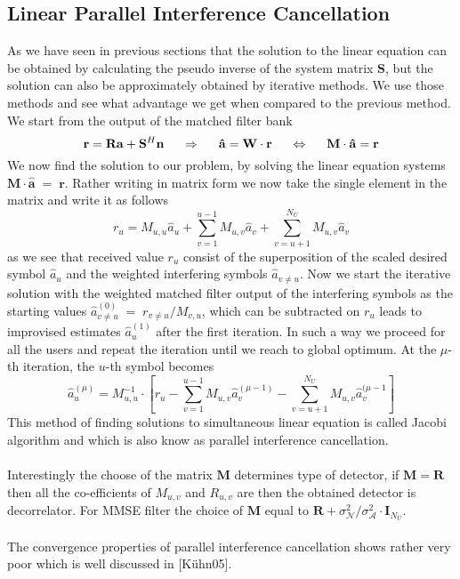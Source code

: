 \subsection{Linear Parallel Interference Cancellation}
As we have seen in previous sections that the solution to the linear equation can be obtained by calculating the pseudo inverse of the system matrix $\mathrm{\mathbf{S}}$, but the solution can also be approximately obtained by iterative methods. We use those methods and see what advantage we get when compared to the previous method. We start from the output of the matched filter bank
\begin{equation}
\mathrm{\mathbf{r}}=\mathrm{\mathbf{R}}\mathrm{\mathbf{a}}+\mathrm{\mathbf{S}}^H\mathrm{\mathbf{n}}\hspace{5mm}\Rightarrow\hspace{5mm}\mathrm{\mathbf{\hat{a}}}=\mathrm{\mathbf{W}}\cdot\mathrm{\mathbf{r}}\hspace{5mm}\Leftrightarrow\hspace{5mm}\mathrm{\mathbf{M}}\cdot\mathrm{\mathbf{\hat{a}}}=\mathrm{\mathbf{r}}
\end{equation}
We now find the solution to our problem, by solving the linear equation systems $\mathrm{\mathbf{M}}\cdot\mathrm{\mathbf{\hat{a}}}\;=\;\mathrm{\mathbf{r}}$. Rather writing in matrix form we now take the single element in the matrix and write it as follows
\begin{equation}
r_u=M_{u,u}\hat{a}_u+\sum\limits_{v=1}^{u-1}M_{u,v}\hat{a}_v+\sum\limits_{v=u+1}^{N_U}M_{u,v}\hat{a}_v
\end{equation}
as we see that received value $r_u$ consist of the superposition of the scaled desired symbol $\hat{a}_u$ and the weighted interfering symbols $\hat{a}_{v\ne u}$. Now we start the iterative solution with the weighted matched filter output of the interfering symbols as the starting values $\hat{a}^{(0)}_{v\ne u}\;=\;r_{v\ne u}/M_{v,u}$, which can be subtracted on $r_u$ leads to improvised estimates $\hat{a}_u^{(1)}$ after the first iteration. In such a way we proceed for all the users and repeat the iteration until we reach to global optimum. At the $\mu$-th iteration, the $u$-th symbol becomes
\begin{equation}
\hat{a}_u^{(\mu)}=M_{u,u}^{-1}\cdot\left[r_u-\sum\limits_{v=1}^{u-1}M_{u,v}\hat{a}_v^{(\mu-1)}-\sum\limits_{v=u+1}^{N_U}M_{u,v}\hat{a}_v^{(\mu-1}\right]
\end{equation}
This method of finding solutions to simultaneous linear equation is called Jacobi algorithm and which is also know as parallel interference cancellation.\\ \\
Interestingly the choose of the matrix $\mathrm{\mathbf{M}}$ determines type of detector, if $\mathrm{\mathbf{M}}=\mathrm{\mathbf{R}}$ then all the co-efficients of $M_{u,v}$ and $R_{u,v}$ are then the obtained detector is decorrelator. For MMSE filter the choice of $\mathrm{\mathbf{M}}$ equal to $\mathrm{\mathbf{R}}+\sigma_{\mathcal{N}}^{2}/\sigma_{\mathcal{A}}^{2}\cdot\mathrm{\mathbf{I}}_{N_U}$. \\ \\
The convergence properties of parallel interference cancellation shows rather very poor which is well discussed in [K\"uhn05].
